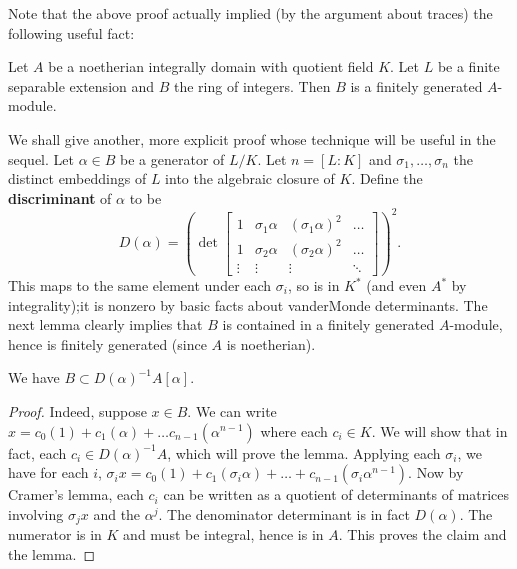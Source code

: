 Note that the above proof actually implied (by the argument about traces) the following useful fact:
\begin{proposition} Let $A$ be a noetherian integrally domain with quotient field $K$.  Let $L$ be a finite separable extension and $B$ the ring of integers. Then $B$ is a finitely generated $A$-module.
\end{proposition}

We shall give another, more explicit proof whose technique will be useful in the sequel.
Let $\alpha  \in B$ be a generator of $L/K$.  Let $n=[L:K]$ and $\sigma_1, \dots, \sigma_n$ the distinct embeddings of $L$ into the algebraic closure of $K$.
Define the \textbf{discriminant} of $\alpha$ to be
\[ D(\alpha) = \left(\det \begin{bmatrix} 
1 & \sigma_1\alpha & (\sigma_1 \alpha)^2 & \dots \\
1 & \sigma_2\alpha & (\sigma_2 \alpha)^2 & \dots \\
\vdots & \vdots & \vdots & \ddots \end{bmatrix}\right)^2 .\]
This maps to the same element under each $\sigma_i$, so is in $K^*$ (and even $A^*$ by integrality);it is nonzero by basic facts about vanderMonde determinants.  The  next lemma clearly implies that $B$ is contained in a finitely generated $A$-module, hence is finitely generated (since $A$ is noetherian).
\begin{lemma} We have $B \subset D(\alpha)^{-1} A[\alpha]$. 
\end{lemma}
\begin{proof}
Indeed, suppose $x \in B$.  We can write $x = c_0 (1) + c_1 (\alpha) + \dots c_{n-1}(\alpha^{n-1})$ where each $c_i \in K$.  We will show that in fact, each $c_i \in D(\alpha)^{-1}A$, which will prove the lemma.  Applying each $\sigma_i$, we have for each $i$, $\sigma_i x = c_0 (1) + c_1 (\sigma_i \alpha) + \dots + c_{n-1} ( \sigma_i \alpha^{n-1})$.
Now by Cramer's lemma, each $c_i$ can be written as a quotient of determinants of matrices involving $\sigma_jx $ and the $\alpha^{j}$.  The denominator determinant is in fact $D(\alpha)$.  The numerator is in $K$ and must be integral, hence is in $A$.  This proves the claim and the lemma.
\end{proof}

